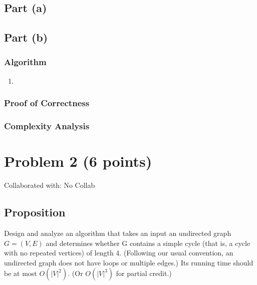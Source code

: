 \documentclass{article}
\begin{document}
\subsection{Part (a)}


\subsection{Part (b)}
\subsubsection{Algorithm}
\begin{enumerate}
      \item
\end{enumerate}

\subsubsection{Proof of Correctness}


\subsubsection{Complexity Analysis}


\newpage
\section{Problem 2 (6 points)}
Collaborated with: No Collab

\subsection{Proposition}
Design and analyze an algorithm that takes an input an undirected graph \(G=(V,E)\) and
determines whether G contains a simple cycle (that is, a cycle with no repeated vertices)
of length 4. (Following our usual convention, an undirected graph does not have loops or
multiple edges.) Its running time should be at most \(O(|V|^2)\). (Or \(O(|V|^3)\) for
partial credit.)
\end{document}
